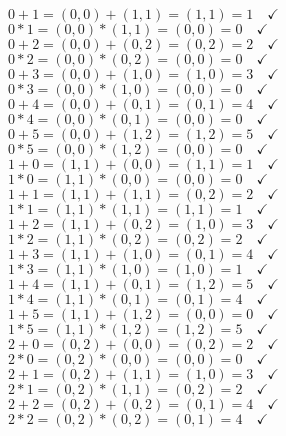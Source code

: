 \documentclass{article} %
\begin{document}
\begin{addmargin}[1em]{0em}
\begin{multicols}{2}
\\$0 + 1 = (0,0) + (1,1) = (1,1) = 1 \quad \checkmark$
\\$0 * 1 = (0,0) * (1,1) = (0,0) = 0 \quad \checkmark$
\\$0 + 2 = (0,0) + (0,2) = (0,2) = 2 \quad \checkmark$
\\$0 * 2 = (0,0) * (0,2) = (0,0) = 0 \quad \checkmark$
\\$0 + 3 = (0,0) + (1,0) = (1,0) = 3 \quad \checkmark$
\\$0 * 3 = (0,0) * (1,0) = (0,0) = 0 \quad \checkmark$
\\$0 + 4 = (0,0) + (0,1) = (0,1) = 4 \quad \checkmark$
\\$0 * 4 = (0,0) * (0,1) = (0,0) = 0 \quad \checkmark$
\\$0 + 5 = (0,0) + (1,2) = (1,2) = 5 \quad \checkmark$
\\$0 * 5 = (0,0) * (1,2) = (0,0) = 0 \quad \checkmark$
\\$1 + 0 = (1,1) + (0,0) = (1,1) = 1 \quad \checkmark$
\\$1 * 0 = (1,1) * (0,0) = (0,0) = 0 \quad \checkmark$
\\$1 + 1 = (1,1) + (1,1) = (0,2) = 2 \quad \checkmark$
\\$1 * 1 = (1,1) * (1,1) = (1,1) = 1 \quad \checkmark$
\\$1 + 2 = (1,1) + (0,2) = (1,0) = 3 \quad \checkmark$
\\$1 * 2 = (1,1) * (0,2) = (0,2) = 2 \quad \checkmark$
\\$1 + 3 = (1,1) + (1,0) = (0,1) = 4 \quad \checkmark$
\\$1 * 3 = (1,1) * (1,0) = (1,0) = 1 \quad \checkmark$
\\$1 + 4 = (1,1) + (0,1) = (1,2) = 5 \quad \checkmark$
\\$1 * 4 = (1,1) * (0,1) = (0,1) = 4 \quad \checkmark$
\\$1 + 5 = (1,1) + (1,2) = (0,0) = 0 \quad \checkmark$
\\$1 * 5 = (1,1) * (1,2) = (1,2) = 5 \quad \checkmark$
\\$2 + 0 = (0,2) + (0,0) = (0,2) = 2 \quad \checkmark$
\\$2 * 0 = (0,2) * (0,0) = (0,0) = 0 \quad \checkmark$
\\$2 + 1 = (0,2) + (1,1) = (1,0) = 3 \quad \checkmark$
\\$2 * 1 = (0,2) * (1,1) = (0,2) = 2 \quad \checkmark$
\\$2 + 2 = (0,2) + (0,2) = (0,1) = 4 \quad \checkmark$
\\$2 * 2 = (0,2) * (0,2) = (0,1) = 4 \quad \checkmark$

\end{multicols}
\end{addmargin}
\end{document}
